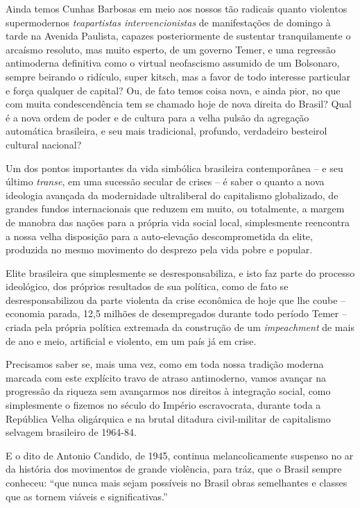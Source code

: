 Ainda temos Cunhas Barbosas em meio aos nossos tão radicais quanto
violentos supermodernos \emph{teapartistas intervencionistas} de
manifestações de domingo à tarde na Avenida Paulista, capazes
posteriormente de sustentar tranquilamente o arcaísmo resoluto, mas
muito esperto, de um governo Temer, e uma regressão antimoderna
definitiva como o virtual neofascismo assumido de um Bolsonaro, sempre
beirando o ridículo, super kitsch, mas a favor de todo interesse
particular e força qualquer de capital? Ou, de fato temos coisa nova, e
ainda pior, no que com muita condescendência tem se chamado hoje de nova
direita do Brasil? Qual é a nova ordem de poder e de cultura para a
velha pulsão da agregação automática brasileira, e seu mais tradicional,
profundo, verdadeiro besteirol cultural nacional?

Um dos pontos importantes da vida simbólica brasileira contemporânea --
e seu último \emph{transe}, em uma sucessão secular de crises -- é saber
o quanto a nova ideologia avançada da modernidade ultraliberal do
capitalismo globalizado, de grandes fundos internacionais que reduzem em
muito, ou totalmente, a margem de manobra das nações para a própria vida
social local, simplesmente reencontra a nossa velha disposição para a
auto-elevação descomprometida da elite, produzida no mesmo movimento do
desprezo pela vida pobre e popular.

Elite brasileira que simplesmente se desresponsabiliza, e isto faz parte
do processo ideológico, dos próprios resultados de sua política, como de
fato se desresponsabilizou da parte violenta da crise econômica de hoje
que lhe coube -- economia parada, 12,5 milhões de desempregados durante
todo período Temer -- criada pela própria política extremada da
construção de um \emph{impeachment} de mais de ano e meio, artificial e
violento, em um país já em crise.

Precisamos saber se, mais uma vez, como em toda nossa tradição moderna
marcada com este explícito travo de atraso antimoderno, vamos avançar na
progressão da riqueza sem avançarmos nos direitos à integração social,
como simplesmente o fizemos no século do Império escravocrata, durante
toda a República Velha oligárquica e na brutal ditadura civil-militar de
capitalismo selvagem brasileiro de 1964-84.

E o dito de Antonio Candido, de 1945, continua melancolicamente suspenso
no ar da história dos movimentos de grande violência, para tráz, que o
Brasil sempre conheceu: ``que nunca mais sejam possíveis no Brasil obras
semelhantes e classes que as tornem viáveis e significativas.''


